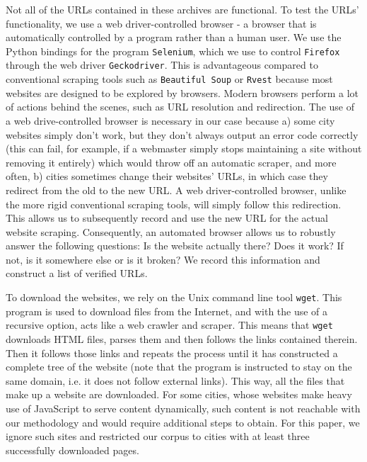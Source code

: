 \documentclass[11pt]{article}
\begin{document}
Not all of the URLs contained in these archives are functional. To test the URLs' functionality, we use a web driver-controlled browser - a browser that is automatically controlled by a program rather than a human user. We use the Python bindings for the program \texttt{Selenium}, which we use to control \texttt{Firefox} through the web driver  \texttt{Geckodriver}. This is advantageous compared to conventional scraping tools such as \texttt{Beautiful Soup} or \texttt{Rvest} because most websites are designed to be explored by browsers. Modern browsers perform a lot of actions behind the scenes, such as URL resolution and redirection. The use of a web drive-controlled browser is necessary in our case because a) some city websites simply don't work, but they don't always output an error code correctly (this can fail, for example, if a webmaster simply stops maintaining a site without removing it entirely) which would throw off an automatic scraper, and more often, b) cities sometimes change their websites' URLs, in which case they redirect from the old to the new URL. A web driver-controlled browser, unlike the more rigid conventional scraping tools, will simply follow this redirection. This allows us to subsequently record and use the new URL for the actual website scraping. Consequently, an automated browser allows us to robustly answer the following questions: Is the website actually there? Does it work? If not, is it somewhere else or is it broken? We record this information and construct a list of verified URLs.

To download the websites, we rely on the Unix command line tool \texttt{wget}. This program is used to download files from the Internet, and with the use of a recursive option, acts like a web crawler and scraper. This means that \texttt{wget} downloads HTML files, parses them and then follows the links contained therein. Then it follows those links and repeats the process until it has constructed a complete tree of the website (note that the program is instructed to stay on the same domain, i.e. it does not follow external links). This way, all the files that make up a website are downloaded. For some cities, whose websites make heavy use of JavaScript to serve content dynamically, such content is not reachable with our methodology and would require additional steps to obtain. For this paper, we ignore such sites and restricted our corpus to cities with at least three successfully downloaded pages.
\end{document}
